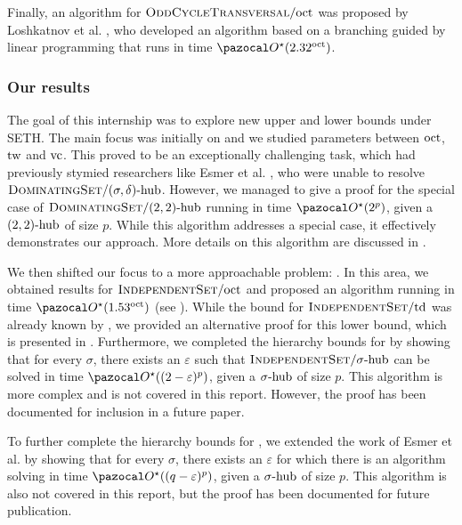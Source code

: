 \medskip

Finally, an algorithm for $\prob{OddCycleTransversal}/\oct$ was proposed by Loshkatnov et al. \cite{lokshtanov2012subexponential}, who developed an algorithm based on a branching guided by linear programming that runs in time $\O^\star(2.32^\oct)$. 

\subsubsection*{Our results}

The goal of this internship was to explore new upper and lower bounds under SETH. The main focus was initially on  and we studied parameters between $\oct$, $\tw$ and $\vc$. This proved to be an exceptionally challenging task, which had previously stymied researchers like Esmer et al. \cite{esmer2024fundamental}, who were unable to resolve $\prob{DominatingSet}/\sdhub$. However, we managed to give a proof for the special case of $\prob{DominatingSet}/\sdhub[2, 2]$ running in time $\O^\star(2^p)$, given a $\sdhub[2,2]$ of size $p$. While this algorithm addresses a special case, it effectively demonstrates our approach.  More details on this algorithm are discussed in .

\medskip

We then shifted our focus to a more approachable problem: . In this area, we obtained results for $\prob{IndependentSet}/\oct$ and proposed an algorithm running in time $\O^\star(1.53^\oct)$ (see ). While the bound for $\prob{IndependentSet}/\td$ was already known by , we provided an alternative proof for this lower bound, which is presented in . Furthermore, we completed the hierarchy bounds for  by showing that for every $\sigma$, there exists an $\varepsilon$ such that $\prob{IndependentSet}/\shub$ can be solved in time $\O^\star((2- \varepsilon)^p)$, given a $\shub$ of size $p$. This algorithm is more complex and is not covered in this report. However, the proof has been documented for inclusion in a future paper.

\medskip

To further complete the hierarchy bounds for , we extended the work of Esmer et al. by showing that for every $\sigma$, there exists an $\varepsilon$ for which there is an algorithm solving  in time $\O^\star((q-\varepsilon)^p)$, given a $\shub$ of size $p$. This algorithm is also not covered in this report, but the proof has been documented for future publication.